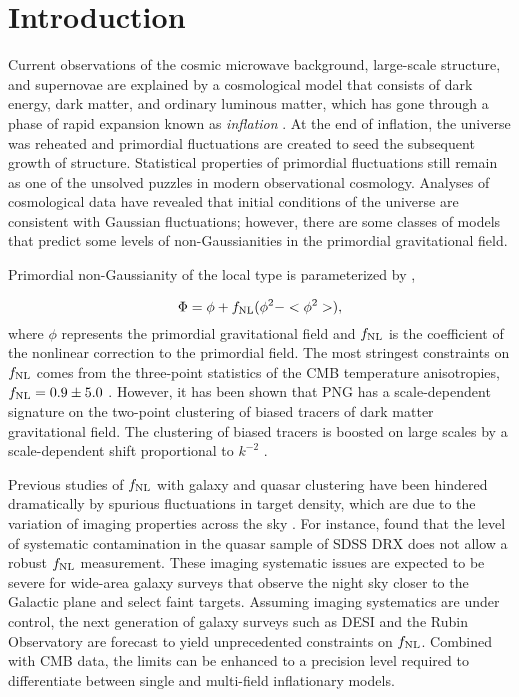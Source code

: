 \section{Introduction}
\label{sec:introduction}
Current observations of the cosmic microwave background, large-scale structure, and supernovae are explained by a cosmological model that consists of dark energy, dark matter, and ordinary luminous matter, which has gone through a phase of rapid expansion known as \textit{inflation} \citep[see, e.g.,][]{weinberg2013observational}. At the end of inflation, the universe was reheated and primordial fluctuations are created to seed the subsequent growth of structure. Statistical properties of primordial fluctuations still remain as one of the unsolved puzzles in modern observational cosmology. Analyses of cosmological data have revealed that initial conditions of the universe are consistent with Gaussian fluctuations; however, there are some classes of models that predict some levels of non-Gaussianities in the primordial gravitational field.

Primordial non-Gaussianity of the local type is parameterized by \cite{komatsu2001acoustic},

\begin{equation}
    \Phi = \phi + f_{\rm NL} (\phi^{2}- <\phi^{2}>),
\end{equation}
where $\phi$ represents the primordial gravitational field and $f_{\rm NL}$ is the coefficient of the nonlinear correction to the primordial field. The most stringest constraints on $f_{\rm NL}$ comes from the three-point statistics of the CMB temperature anisotropies, $f_{\rm NL}=0.9\pm 5.0$ \citep{akrami2019planck}. However, it has been shown that PNG has a scale-dependent signature on the two-point clustering of biased tracers of dark matter gravitational field. The clustering of biased tracers is boosted on large scales by a scale-dependent shift proportional to $k^{-2}$ \citep[see,][]{dalal2008imprints}.

Previous studies of $f_{\rm NL}$ with galaxy and quasar clustering have been hindered dramatically by spurious fluctuations in target density, which are due to the variation of imaging properties across the sky \citep{Ho2015JCAP...05..040H}. For instance, \cite{pullen2013systematic} found that the level of systematic contamination in the quasar sample of SDSS DRX does not allow a robust $f_{\rm NL}$ measurement. These imaging systematic issues are expected to be severe for wide-area galaxy surveys that observe the night sky closer to the Galactic plane and select faint targets. Assuming imaging systematics are under control, the next generation of galaxy surveys such as DESI and the Rubin Observatory are forecast to yield unprecedented constraints on $f_{\rm NL}$. Combined with CMB data, the limits can be enhanced to a precision level required to differentiate between single and multi-field inflationary models.


